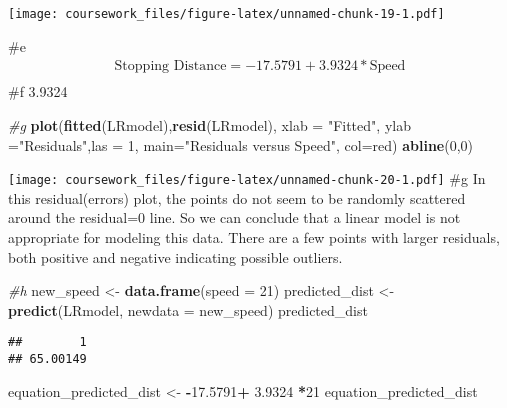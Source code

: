 \documentclass[
]{article}
\newenvironment{Shaded}{\begin{snugshade}}{\end{snugshade}}
\newcommand{\AttributeTok}[1]{\textcolor[rgb]{0.13,0.29,0.53}{#1}}
\newcommand{\CommentTok}[1]{\textcolor[rgb]{0.56,0.35,0.01}{\textit{#1}}}
\newcommand{\DecValTok}[1]{\textcolor[rgb]{0.00,0.00,0.81}{#1}}
\newcommand{\FloatTok}[1]{\textcolor[rgb]{0.00,0.00,0.81}{#1}}
\newcommand{\FunctionTok}[1]{\textcolor[rgb]{0.13,0.29,0.53}{\textbf{#1}}}
\newcommand{\NormalTok}[1]{#1}
\newcommand{\OtherTok}[1]{\textcolor[rgb]{0.56,0.35,0.01}{#1}}
\newcommand{\SpecialCharTok}[1]{\textcolor[rgb]{0.81,0.36,0.00}{\textbf{#1}}}
\newcommand{\StringTok}[1]{\textcolor[rgb]{0.31,0.60,0.02}{#1}}
\begin{document}
\texttt{[image: coursework\_files/figure-latex/unnamed-chunk-19-1.pdf]}

\#e \[
\begin{aligned}
\text{Stopping Distance}=-17.5791+ 3.9324 * \text{Speed}\\
\end{aligned}
\] \#f 3.9324

\begin{Shaded}
\begin{Highlighting}[]
\CommentTok{\#g}
\FunctionTok{plot}\NormalTok{(}\FunctionTok{fitted}\NormalTok{(LRmodel),}\FunctionTok{resid}\NormalTok{(LRmodel),}
     \AttributeTok{xlab =} \StringTok{"Fitted"}\NormalTok{, }\AttributeTok{ylab =}\StringTok{"Residuals"}\NormalTok{,}\AttributeTok{las =} \DecValTok{1}\NormalTok{, }
     \AttributeTok{main=}\StringTok{"Residuals versus Speed"}\NormalTok{,}
     \AttributeTok{col=}\StringTok{\textquotesingle{}red\textquotesingle{}}\NormalTok{) }
\FunctionTok{abline}\NormalTok{(}\DecValTok{0}\NormalTok{,}\DecValTok{0}\NormalTok{)}
\end{Highlighting}
\end{Shaded}

\texttt{[image: coursework\_files/figure-latex/unnamed-chunk-20-1.pdf]}
\#g In this residual(errors) plot, the points do not seem to be randomly
scattered around the residual=0 line. So we can conclude that a linear
model is not appropriate for modeling this data. There are a few points
with larger residuals, both positive and negative indicating possible
outliers.

\begin{Shaded}
\begin{Highlighting}[]
\CommentTok{\#h}
\NormalTok{new\_speed }\OtherTok{\textless{}{-}} \FunctionTok{data.frame}\NormalTok{(}\AttributeTok{speed =} \DecValTok{21}\NormalTok{)}
\NormalTok{predicted\_dist }\OtherTok{\textless{}{-}} \FunctionTok{predict}\NormalTok{(LRmodel, }\AttributeTok{newdata =}\NormalTok{ new\_speed)}
\NormalTok{predicted\_dist}
\end{Highlighting}
\end{Shaded}

\begin{verbatim}
##        1 
## 65.00149
\end{verbatim}

\begin{Shaded}
\begin{Highlighting}[]
\NormalTok{equation\_predicted\_dist }\OtherTok{\textless{}{-}} \SpecialCharTok{{-}}\FloatTok{17.5791}\SpecialCharTok{+} \FloatTok{3.9324} \SpecialCharTok{*}\DecValTok{21}
\NormalTok{equation\_predicted\_dist}
\end{Highlighting}
\end{Shaded}
\end{document}
